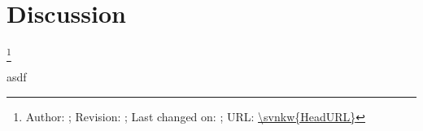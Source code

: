 \section{Discussion}

\footnote{Author: \svnauthor; Revision: \svnrev; Last changed on: \svndate; URL: \url{\svnkw{HeadURL}}}

asdf
